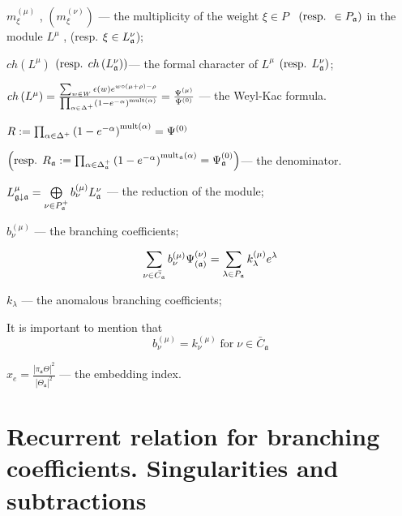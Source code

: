 \documentclass[a4paper,12pt]{article}
\theoremstyle{definition} \newtheorem{Def}{Definition}
\begin{document}
$m_{\xi }^{\left( \mu \right) }$ , $\left( m_{\xi }^{\left( \nu \right)
}\right) $ --- the multiplicity of the weight $\xi \in P$ \ $\left( \text{%
resp. }\in P_{\frak{a}}\right) $ in the module $L^{\mu }$ , (resp. $\xi \in
L_{\frak{a}}^{\nu } $);

$ch\left( L^{\mu }\right) $ $\left( \text{resp. }ch\left( L_{\frak{a}}^{\nu
}\right) \right) $--- the formal character of $L^{\mu }$ $\left( \text{resp. }%
L_{\frak{a}}^{\nu }\right) $;

$ch\left( L^{\mu }\right) =\frac{\sum_{w\in W}\epsilon (w)e^{w\circ (\mu
+\rho )-\rho }}{\prod_{\alpha \in \Delta ^{+}}\left( 1-e^{-\alpha }\right) ^{%
\mathrm{{mult}\left( \alpha \right) }}}=\frac{\Psi ^{\left( \mu \right) }}{%
\Psi ^{\left( 0\right) }}$ --- the Weyl-Kac formula.

$R:=\prod_{\alpha \in \Delta ^{+}}\left( 1-e^{-\alpha }\right) ^{\mathrm{{%
mult}\left( \alpha \right) }}=\Psi ^{\left( 0\right) }\quad $

\noindent $\left( \text{resp. }R_{\frak{a}}:=\prod_{\alpha \in \Delta _{%
\frak{a}}^{+}}\left( 1-e^{-\alpha }\right) ^{\mathrm{mult}_{\frak{a}}\mathrm{%
\left( \alpha \right) }}=\Psi _{\frak{a}}^{\left( 0\right) }\right) $--- the
denominator.

$  L_{\frak{g}\downarrow \frak{a}}^{\mu }=\bigoplus\limits_{\nu \in P_{\frak{a}}^{+}}b_{\nu }^{\left( \mu \right) }L_{\frak{a}}^{\nu }$ --- the reduction of the module;


$b^{(\mu)}_{\nu}$ --- the branching coefficients;

\begin{equation}
  \label{eq:21}
  \sum_{\nu \in \bar{C_{\mathfrak{a}}}}b_{\nu }^{\left( \mu \right) }\Psi _{\left( \frak{%
        a}\right) }^{\left( \nu \right) }=\sum_{\lambda \in P_{\frak{a}}}k_{\lambda
  }^{\left( \mu \right) }e^{\lambda }
\end{equation}

 $k_{\lambda}$ --- the anomalous branching coefficients;

It is important to mention that
\begin{equation}
  \label{eq:20}
  b^{(\mu)}_{\nu}=k^{(\mu)}_{\nu} \; \mbox{for} \; \nu\in \bar{C}_{\mathfrak{a}}
\end{equation}

$x_e=\frac{\left|\pi_{\mathfrak{a}} \Theta\right|^2}{\left|\Theta_{\mathfrak{a}}\right|^2}$ --- the embedding index.

\section{Recurrent relation for branching coefficients. Singularities and subtractions}
\label{sec:recurr-form-branch}
\end{document}
